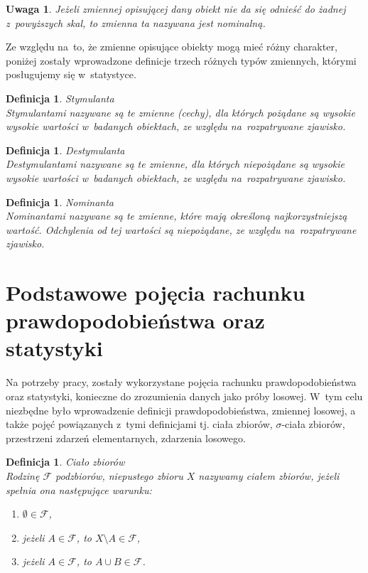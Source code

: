 \documentclass[12pt,a4paper]{report}
\newtheorem{definition}[theorem]{Definicja}
\newtheorem{uwaga}{Uwaga}
\begin{document}
\begin{uwaga}
Jeżeli zmiennej opisującej dany obiekt nie da się odnieść do żadnej z~powyższych skal, to zmienna ta nazywana jest nominalną.
\end{uwaga}

Ze względu na~to, że zmienne opisujące obiekty mogą mieć różny charakter, poniżej zostały wprowadzone definicje trzech różnych typów zmiennych, którymi posługujemy się w~statystyce. 

\begin{definition}{Stymulanta \cite[Rozdział 1.5]{panek2013}}\\
Stymulantami nazywane są te zmienne (cechy), dla których pożądane są wysokie wysokie wartości w~badanych obiektach, ze względu na~rozpatrywane zjawisko. 
\end{definition}

\begin{definition}{Destymulanta \cite[Rozdział 1.5]{panek2013}}\\
Destymulantami nazywane są te  zmienne, dla których niepożądane są wysokie wysokie wartości w~badanych obiektach, ze względu na~rozpatrywane zjawisko. 
\end{definition}

\begin{definition}{Nominanta \cite[Rozdział 1.5]{panek2013}}\\
Nominantami nazywane są te zmienne, które mają określoną najkorzystniejszą wartość. Odchylenia od tej wartości są niepożądane, ze względu na~rozpatrywane zjawisko. 
\end{definition}



\section{Podstawowe pojęcia rachunku prawdopodobieństwa oraz statystyki} \label{rachunek prawdopodobienstwa}


Na potrzeby pracy, zostały wykorzystane pojęcia rachunku prawdopodobieństwa oraz statystyki, konieczne do zrozumienia danych jako próby losowej. W~tym celu niezbędne było wprowadzenie definicji prawdopodobieństwa, zmiennej losowej, a także pojęć powiązanych z~tymi definicjami tj. ciała zbiorów, $\sigma$-ciała zbiorów, przestrzeni zdarzeń elementarnych, zdarzenia losowego.


\begin{definition}{Ciało zbiorów \cite[Rozdział 8.1]{rudnicki2006}}\\
Rodzinę $\mathcal{F}$ podzbiorów, niepustego zbioru $X$ nazywamy ciałem zbiorów, jeżeli spełnia ona następujące warunku: 
\begin{enumerate}
\item $\emptyset \in \mathcal{F}$,
\item jeżeli $A \in \mathcal{F}$, to $X \setminus A \in \mathcal{F}$,
\item jeżeli $A \in \mathcal{F}$, to $A \cup B \in \mathcal{F}$.
\end{enumerate}
\end{definition}
\end{document}
